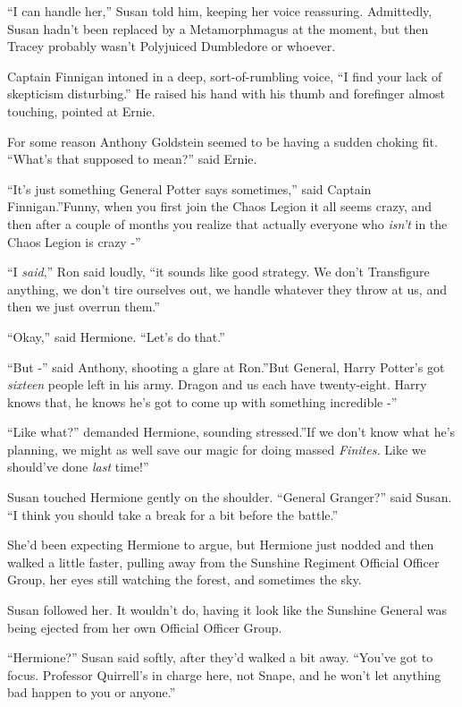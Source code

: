``I can handle her,'' Susan told him, keeping her voice reassuring.
Admittedly, Susan hadn't been replaced by a Metamorphmagus at the
moment, but then Tracey probably wasn't Polyjuiced Dumbledore or
whoever.

Captain Finnigan intoned in a deep, sort-of-rumbling voice, ``I find
your lack of skepticism disturbing.'' He raised his hand with his thumb
and forefinger almost touching, pointed at Ernie.

For some reason Anthony Goldstein seemed to be having a sudden choking
fit. ``What's that supposed to mean?'' said Ernie.

``It's just something General Potter says sometimes,'' said Captain
Finnigan.''Funny, when you first join the Chaos Legion it all seems
crazy, and then after a couple of months you realize that actually
everyone who \emph{isn't} in the Chaos Legion is crazy -''

``I \emph{said},'' Ron said loudly, ``it sounds like good strategy. We
don't Transfigure anything, we don't tire ourselves out, we handle
whatever they throw at us, and then we just overrun them.''

``Okay,'' said Hermione. ``Let's do that.''

``But -'' said Anthony, shooting a glare at Ron.''But General, Harry
Potter's got \emph{sixteen} people left in his army. Dragon and us each
have twenty-eight. Harry knows that, he knows he's got to come up with
something incredible -''

``Like what?'' demanded Hermione, sounding stressed.''If we don't know
what he's planning, we might as well save our magic for doing massed
\emph{Finites.} Like we should've done \emph{last} time!''

Susan touched Hermione gently on the shoulder. ``General Granger?'' said
Susan. ``I think you should take a break for a bit before the battle.''

She'd been expecting Hermione to argue, but Hermione just nodded and
then walked a little faster, pulling away from the Sunshine Regiment
Official Officer Group, her eyes still watching the forest, and
sometimes the sky.

Susan followed her. It wouldn't do, having it look like the Sunshine
General was being ejected from her own Official Officer Group.

``Hermione?'' Susan said softly, after they'd walked a bit away.
``You've got to focus. Professor Quirrell's in charge here, not Snape,
and he won't let anything bad happen to you or anyone.''

